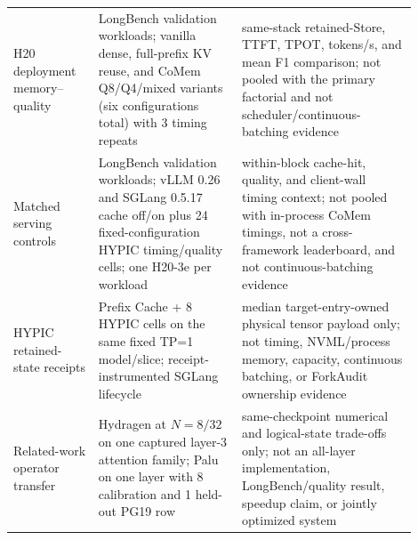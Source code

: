 \documentclass{article}
\begin{document}
\begin{longtable}{@{}>{\raggedright\arraybackslash}p{0.19\linewidth}>{\raggedright\arraybackslash}p{0.32\linewidth}>{\raggedright\arraybackslash}p{0.39\linewidth}@{}}
  H20 deployment memory--quality & 8 LongBench validation workloads; vanilla dense, full-prefix KV reuse, and CoMem Q8/Q4/mixed variants (six configurations total) with 3 timing repeats & same-stack retained-Store, TTFT, TPOT, tokens/s, and mean F1 comparison; not pooled with the primary factorial and not scheduler/continuous-batching evidence \\
  Matched serving controls & 8 LongBench validation workloads; vLLM 0.26 and SGLang 0.5.17 cache off/on plus 24 fixed-configuration HYPIC timing/quality cells; one H20-3e per workload & within-block cache-hit, quality, and client-wall timing context; not pooled with in-process CoMem timings, not a cross-framework leaderboard, and not continuous-batching evidence \\
  HYPIC retained-state receipts & 8 Prefix Cache + 8 HYPIC cells on the same fixed TP=1 model/slice; receipt-instrumented SGLang lifecycle & median target-entry-owned physical tensor payload only; not timing, NVML/process memory, capacity, continuous batching, or ForkAudit ownership evidence \\
  Related-work operator transfer & Hydragen at $N=8/32$ on one captured layer-3 attention family; Palu on one layer with 8 calibration and 1 held-out PG19 row & same-checkpoint numerical and logical-state trade-offs only; not an all-layer implementation, LongBench/quality result, speedup claim, or jointly optimized system \\
\end{longtable}
\endgroup
\end{document}
